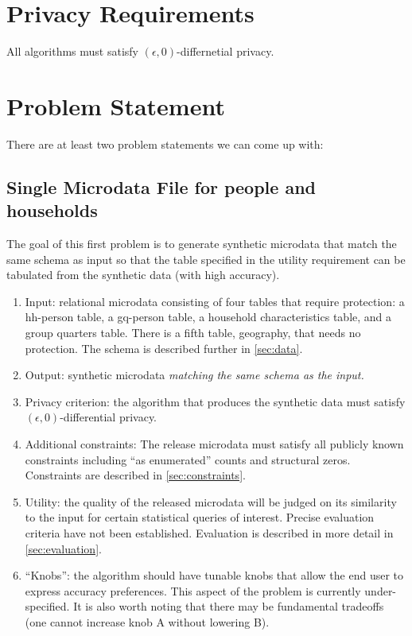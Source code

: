 \documentclass{amsart}
\begin{document}
\section{Privacy Requirements}
All algorithms must satisfy $(\epsilon, 0)$-differnetial privacy. 



\section{Problem Statement} \label{sec:problem}
There are at least two problem statements we can come up with:

\subsection{Single Microdata File for people and households}
The goal of this first problem is to generate synthetic microdata that match the same schema as input so that the table specified in the utility requirement can be tabulated from the synthetic data (with high accuracy).
\begin{enumerate}
	\item Input: relational microdata consisting of four tables that require protection: a hh-person table, a gq-person table, a household characteristics table, and a group quarters table. There is a fifth table, geography, that needs no protection.  The schema is described further in \cref{sec:data}.
	\item Output: synthetic microdata \emph{matching the same schema as the input.}
	\item Privacy criterion: the algorithm that produces the synthetic data must satisfy $(\epsilon, 0)$-differential privacy.
	\item Additional constraints: The release microdata must satisfy all publicly known constraints including ``as enumerated'' counts and structural zeros.  Constraints are described in \cref{sec:constraints}.
	\item Utility: the quality of the released microdata will be judged on its similarity to the input for certain statistical queries of interest.  Precise evaluation criteria have not been established.  Evaluation is described in more detail in \cref{sec:evaluation}.
	\item ``Knobs'': the algorithm should have tunable knobs that allow the end user to express accuracy preferences.  This aspect of the problem is currently under-specified.  It is also worth noting that there may be fundamental tradeoffs (one cannot increase knob A without lowering B).
\end{enumerate}
\end{document}
